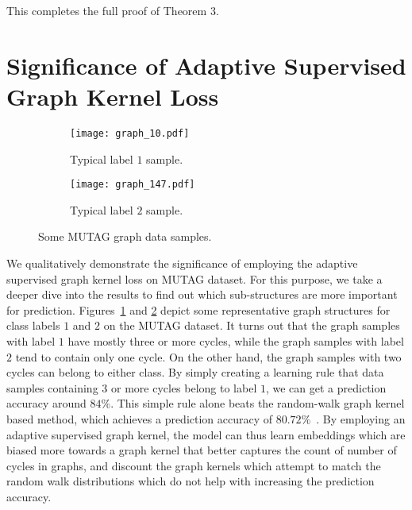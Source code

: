 \documentclass{article}
\begin{document}
This completes the full proof of Theorem 3.

\section{Significance of Adaptive Supervised Graph Kernel Loss }


\begin{figure}[h!]
	
	\begin{subfigure}[t]{0.45\textwidth}
		\centering
		\texttt{[image: graph\_10.pdf]}
		\vspace{-2em}
		\caption{Typical label $1$ sample.}
		\label{fig:l1_sample}
	\end{subfigure}
\begin{subfigure}[t]{0.45\textwidth}
		\centering
		\texttt{[image: graph\_147.pdf]}
		\vspace{-2em}
		\caption[short]{Typical label $2$  sample. }
		
		\label{fig:l2_sample}
	\end{subfigure} 
	
	\caption{Some MUTAG graph data samples.}\label{fig:projection-results}
	
\end{figure}

We qualitatively demonstrate the    significance of employing the adaptive supervised graph kernel loss on MUTAG dataset. For this purpose, we take a deeper dive into the results to find out which sub-structures are more important for prediction.  Figures~\ref{fig:l1_sample} and \ref{fig:l2_sample} depict some representative  graph structures for class labels $1$ and $2$   on the MUTAG dataset. It turns out that the graph samples with label $1$ have mostly three or more cycles, while the graph samples with  label $2$ tend to contain only one cycle. On the other hand, the graph samples with two cycles can belong to either class. By  simply  creating a learning rule that data samples containing $3$ or more cycles belong to label $1$, we can get a prediction  accuracy around $84\%$. This simple rule alone beats the random-walk graph kernel based method, which achieves a prediction accuracy of $80.72\%$~\cite{shervashidze2011weisfeiler}. By employing an adaptive supervised graph kernel, the model can thus learn  embeddings which are biased more towards a graph kernel that better captures the count of number of cycles in graphs, and discount the graph kernels which attempt to match the random walk distributions which do not help with increasing the prediction accuracy. 
\end{document}
